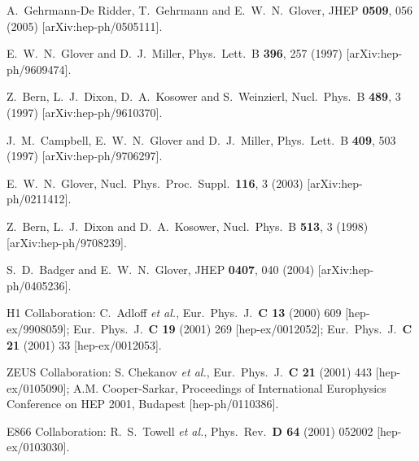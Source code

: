\documentclass[12pt]{iopart}
\begin{document}
\begin{thebibliography}{99}
  A.~Gehrmann-De Ridder, T.~Gehrmann and E.~W.~N.~Glover,
  JHEP {\bf 0509}, 056 (2005)
  [arXiv:hep-ph/0505111].

  E.~W.~N.~Glover and D.~J.~Miller,
  Phys.\ Lett.\ B {\bf 396}, 257 (1997)
  [arXiv:hep-ph/9609474].
  
  Z.~Bern, L.~J.~Dixon, D.~A.~Kosower and S.~Weinzierl,
  Nucl.\ Phys.\ B {\bf 489}, 3 (1997)
  [arXiv:hep-ph/9610370].
  
  J.~M.~Campbell, E.~W.~N.~Glover and D.~J.~Miller,
  Phys.\ Lett.\ B {\bf 409}, 503 (1997)
  [arXiv:hep-ph/9706297].
  
  E.~W.~N.~Glover,
  Nucl.\ Phys.\ Proc.\ Suppl.\  {\bf 116}, 3 (2003)
  [arXiv:hep-ph/0211412].
  
  Z.~Bern, L.~J.~Dixon and D.~A.~Kosower,
  Nucl.\ Phys.\ B {\bf 513}, 3 (1998)
  [arXiv:hep-ph/9708239].

  S.~D.~Badger and E.~W.~N.~Glover,
  JHEP {\bf 0407}, 040 (2004)
  [arXiv:hep-ph/0405236].

H1 Collaboration: C.\ Adloff {\it et al.},
Eur.\ Phys.\ J.\ {\bf C 13} (2000) 609 [hep-ex/9908059]; %
Eur.\ Phys.\ J.\ {\bf C 19} (2001) 269 [hep-ex/0012052]; %
Eur.\ Phys.\ J.\ {\bf C 21} (2001) 33 [hep-ex/0012053].

ZEUS Collaboration: S. Chekanov {\it et al.},
Eur.\ Phys.\  J.\ {\bf C 21} (2001) 443 [hep-ex/0105090];
A.M. Cooper-Sarkar,
Proceedings of International Europhysics Conference
on HEP 2001, Budapest [hep-ph/0110386].


E866 Collaboration: R.\ S.\ Towell {\it et al.},
Phys.\ Rev.\ {\bf D 64} (2001) 052002 [hep-ex/0103030].


\end{thebibliography}
\end{document}
